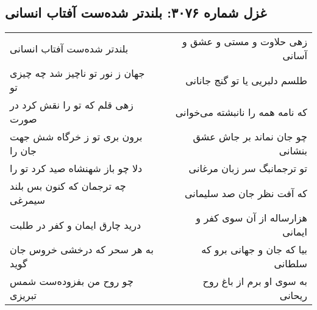 \begin{center}
\section*{غزل شماره ۳۰۷۶: بلندتر شده‌ست آفتاب انسانی}
\label{sec:3076}
\begin{longtable}{l p{0.5cm} r}
بلندتر شده‌ست آفتاب انسانی
&&
زهی حلاوت و مستی و عشق و آسانی
\\
جهان ز نور تو ناچیز شد چه چیزی تو
&&
طلسم دلبریی یا تو گنج جانانی
\\
زهی قلم که تو را نقش کرد در صورت
&&
که نامه همه را نانبشته می‌خوانی
\\
برون بری تو ز خرگاه شش جهت جان را
&&
چو جان نماند بر جاش عشق بنشانی
\\
دلا چو باز شهنشاه صید کرد تو را
&&
تو ترجمانبگ سر زبان مرغانی
\\
چه ترجمان که کنون بس بلند سیمرغی
&&
که آفت نظر جان صد سلیمانی
\\
درید چارق ایمان و کفر در طلبت
&&
هزارساله از آن سوی کفر و ایمانی
\\
به هر سحر که درخشی خروس جان گوید
&&
بیا که جان و جهانی برو که سلطانی
\\
چو روح من بفزوده‌ست شمس تبریزی
&&
به سوی او برم از باغ روح ریحانی
\\
\end{longtable}
\end{center}
